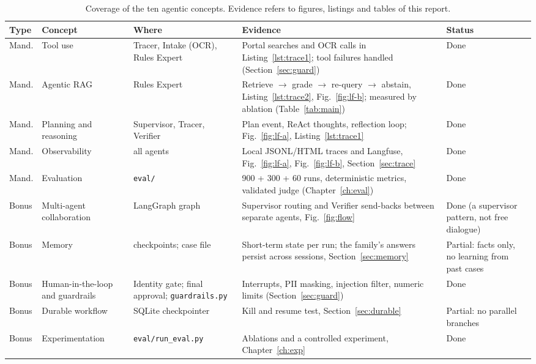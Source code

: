 \documentclass[12pt,a4paper,oneside]{report}
\begin{document}
\begin{table}[H]
\centering\footnotesize{}
\caption[Coverage of the ten agentic concepts]{Coverage of the ten agentic concepts. Evidence refers to figures, listings and tables of this report.}\label{tab:matrix}
\renewcommand{\arraystretch}{1.1}
\begin{tabularx}{\linewidth}{@{}p{0.9cm}p{2.0cm}p{2.4cm}Xp{2.2cm}@{}}
\toprule
\textbf{Type} & \textbf{Concept} & \textbf{Where} & \textbf{Evidence} & \textbf{Status} \\ \midrule
Mand. & Tool use & Tracer, Intake (OCR), Rules Expert & Portal searches and OCR calls in Listing~\ref{lst:trace1}; tool failures handled (Section~\ref{sec:guard}) & Done \\
Mand. & Agentic RAG & Rules Expert & Retrieve $\to$ grade $\to$ re-query $\to$ abstain, Listing~\ref{lst:trace2}, Fig.~\ref{fig:lf-b}; measured by ablation (Table~\ref{tab:main}) & Done \\
Mand. & Planning and reasoning & Supervisor, Tracer, Verifier & Plan event, ReAct thoughts, reflection loop; Fig.~\ref{fig:lf-a}, Listing~\ref{lst:trace1} & Done \\
Mand. & Observability & all agents & Local JSONL/HTML traces and Langfuse, Fig.~\ref{fig:lf-a}, Fig.~\ref{fig:lf-b}, Section~\ref{sec:trace} & Done \\
Mand. & Evaluation & \texttt{eval/} & 900 + 300 + 60 runs, deterministic metrics, validated judge (Chapter~\ref{ch:eval}) & Done \\
Bonus & Multi-agent collaboration & LangGraph graph & Supervisor routing and Verifier send-backs between separate agents, Fig.~\ref{fig:flow} & Done (a supervisor pattern, not free dialogue) \\
Bonus & Memory & checkpoints; case file & Short-term state per run; the family's answers persist across sessions, Section~\ref{sec:memory} & Partial: facts only, no learning from past cases \\
Bonus & Human-in-the-loop and guardrails & Identity gate; final approval; \texttt{guardrails.py} & Interrupts, PII masking, injection filter, numeric limits (Section~\ref{sec:guard}) & Done \\
Bonus & Durable workflow & SQLite checkpointer & Kill and resume test, Section~\ref{sec:durable} & Partial: no parallel branches \\
Bonus & Experimentation & \texttt{eval/run\_eval.py} & Ablations and a controlled experiment, Chapter~\ref{ch:exp} & Done \\ \bottomrule
\end{tabularx}
\end{table}
\end{document}
